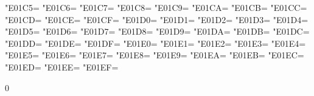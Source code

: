 \XeTeXcharclass"E01C5=\KclassCM
\XeTeXcharclass"E01C6=\KclassCM
\XeTeXcharclass"E01C7=\KclassCM
\XeTeXcharclass"E01C8=\KclassCM
\XeTeXcharclass"E01C9=\KclassCM
\XeTeXcharclass"E01CA=\KclassCM
\XeTeXcharclass"E01CB=\KclassCM
\XeTeXcharclass"E01CC=\KclassCM
\XeTeXcharclass"E01CD=\KclassCM
\XeTeXcharclass"E01CE=\KclassCM
\XeTeXcharclass"E01CF=\KclassCM
\XeTeXcharclass"E01D0=\KclassCM
\XeTeXcharclass"E01D1=\KclassCM
\XeTeXcharclass"E01D2=\KclassCM
\XeTeXcharclass"E01D3=\KclassCM
\XeTeXcharclass"E01D4=\KclassCM
\XeTeXcharclass"E01D5=\KclassCM
\XeTeXcharclass"E01D6=\KclassCM
\XeTeXcharclass"E01D7=\KclassCM
\XeTeXcharclass"E01D8=\KclassCM
\XeTeXcharclass"E01D9=\KclassCM
\XeTeXcharclass"E01DA=\KclassCM
\XeTeXcharclass"E01DB=\KclassCM
\XeTeXcharclass"E01DC=\KclassCM
\XeTeXcharclass"E01DD=\KclassCM
\XeTeXcharclass"E01DE=\KclassCM
\XeTeXcharclass"E01DF=\KclassCM
\XeTeXcharclass"E01E0=\KclassCM
\XeTeXcharclass"E01E1=\KclassCM
\XeTeXcharclass"E01E2=\KclassCM
\XeTeXcharclass"E01E3=\KclassCM
\XeTeXcharclass"E01E4=\KclassCM
\XeTeXcharclass"E01E5=\KclassCM
\XeTeXcharclass"E01E6=\KclassCM
\XeTeXcharclass"E01E7=\KclassCM
\XeTeXcharclass"E01E8=\KclassCM
\XeTeXcharclass"E01E9=\KclassCM
\XeTeXcharclass"E01EA=\KclassCM
\XeTeXcharclass"E01EB=\KclassCM
\XeTeXcharclass"E01EC=\KclassCM
\XeTeXcharclass"E01ED=\KclassCM
\XeTeXcharclass"E01EE=\KclassCM
\XeTeXcharclass"E01EF=\KclassCM

 0{\intercharspace}
\XeTeXinterchartoks {}
